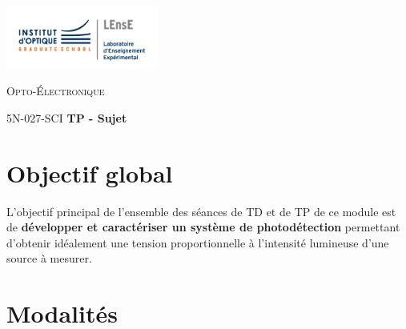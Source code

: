 \documentclass[a4paper,11pt,twoside]{book} %
\begin{document}
\clearpage
\thispagestyle{empty}
\mbox{} %

\clearpage
\setcounter{page}{1} %
\pagestyle{plain} %

\begin{minipage}[c]{.25\linewidth}
	\includegraphics[width=5cm]{images/LEnsE_IOGS.jpg}
\end{minipage} \hfill
\begin{minipage}[c]{.4\linewidth}

\begin{center}
\vspace{0.3cm}
{\Large \textsc{Opto-Électronique}}

\medskip

5N-027-SCI \qquad \textbf{\Large TP - Sujet}

\end{center}
\end{minipage}\hfill


\section{Objectif global}

L'objectif principal de l'ensemble des séances de TD et de TP de ce module est de \textbf{développer et caractériser un système de photodétection} permettant d'obtenir idéalement une tension proportionnelle à l'intensité lumineuse d'une source à mesurer.

\section{Modalités}
\end{document}
